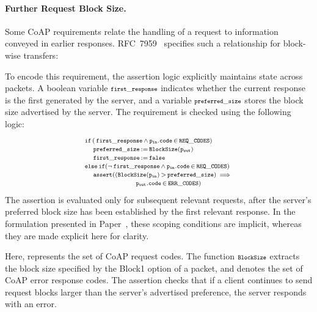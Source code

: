 \paragraph{Further Request Block Size.}
Some CoAP requirements relate the handling of a request to information conveyed in earlier responses.
RFC~7959~\cite[p.~14]{RFC7959} specifies such a relationship for block-wise transfers:
%
%
%

To encode this requirement, the assertion logic explicitly maintains state across packets.
A boolean variable $\mathtt{\scriptstyle first\_response}$ indicates whether the current response is the first generated by the server, and a variable $\mathtt{\scriptstyle preferred\_size}$ stores the block size advertised by the server.
The requirement is checked using the following logic:
%
\begin{equation*}
	\begin{split}
		& \scriptstyle \mathtt{if} \, (\, \mathtt{\scriptstyle first\_response} \, \land \, \mathtt{\scriptstyle p_{in}.code} \, \in \, \mathtt{\scriptstyle REQ\_CODES})\\[-5pt]
		& \scriptstyle \quad \mathtt{\scriptstyle preferred\_size} \, := \, \mathtt{\scriptstyle BlockSize (p_{out})}\\[-5pt]
		& \scriptstyle \quad \mathtt{\scriptstyle first\_response} \, := \, \mathtt{false} \\[-5pt]
		& \scriptstyle \mathtt{else \, if} (\neg \, \mathtt{\scriptstyle first\_response} \, \land \, \mathtt{\scriptstyle p_{in}.code} \, \in \, \mathtt{\scriptstyle REQ\_CODES})\\[-5pt]
		& \scriptstyle \quad \mathtt{assert} ((\mathtt{\scriptstyle BlockSize (p_{in})} \, > \, \mathtt{\scriptstyle preferred\_size}) \, \implies \\[-5pt]
		& \scriptstyle \qquad\qquad\qquad \mathtt{\scriptstyle p_{out}.code} \, \in \,  \mathtt{\scriptstyle ERR\_CODES})
	\end{split}
\end{equation*}
%
The assertion is evaluated only for subsequent relevant requests, after the server’s preferred block size has been established by the first relevant response. In the formulation presented in Paper~, these scoping conditions are implicit, whereas they are made explicit here for clarity.

Here,  represents the set of CoAP request codes.
The function $\mathtt{\scriptstyle BlockSize}$ extracts the block size specified by the Block1 option of a packet, and  denotes the set of CoAP error response codes.
The assertion checks that if a client continues to send request blocks larger than the server's advertised preference, the server responds with an error.

